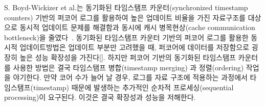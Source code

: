 S. Boyd-Wickizer et al.는 동기화된 타임스탬프 카운터(synchronized timestamp counters) 기반의
퍼코어 로그를 활용하여 높은 업데이트 비율을 가진 자료구조를 대상으로 동시적 업데이트 문제를
해결함과 동시에 캐시 병목현상(cache communication bottleneck)을
줄였다~\cite{SilasBoydWickizerPth}.
동기화된 타임스탬프 카운터 기반의 퍼코어 로그를 활용한 동시적 업데이트방법은
업데이트 부분만 고려했을 때, 퍼코어에 데이터를 저장함으로 굉장히 높은 성능 확장성을
 가진다[].
하지만 퍼코어 기반의 동기화된 타임스탬프 카운터를 사용한 방법은 결국 타임스탬프 병합(timestamp merging)
과 정렬(ordering) 작업을 야기한다.
만약 코어 수가 늘어 날 경우, 로그를 자료 구조에 적용하는 과정에서 타임스탬프(timestamp)
 때문에 발생하는 추가적인 순차적 프로세싱(sequential processing)이 요구된다.
이것은 결국 확장성과 성능을 저해한다. 


